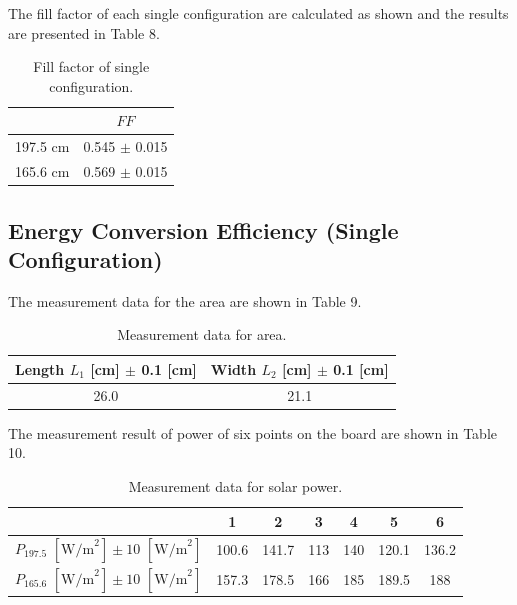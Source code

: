 \documentclass{article}
\begin{document}
{The fill factor of each single configuration are calculated as shown and the results are presented in Table 8.

\begin{table}[H]\centering
    \begin{tabular}{cc}
        \toprule
                 & $FF$               \\
        \midrule
        197.5 cm & 0.545  $\pm$ 0.015 \\
        165.6 cm & 0.569  $\pm$ 0.015 \\
        \bottomrule
    \end{tabular}
    \caption{Fill factor of single configuration.}\label{Tablefill}
\end{table}

\subsection{Energy Conversion Efficiency (Single Configuration)}

The measurement data for the area are shown in Table 9.
\begin{table}[H]\centering
    \begin{tabular}{cc}
        \toprule
        Length $L_1$ [cm] $\pm$ 0.1 [cm] & Width $L_2$ [cm] $\pm$ 0.1 [cm] \\
        \midrule
        26.0                             & 21.1                            \\
        \bottomrule
    \end{tabular}
    \caption{Measurement data for area.}\label{TableArea}
\end{table}

The measurement result of power of six points on the board are shown in Table 10.
\begin{table}[H]\centering
    \begin{tabular}{ccccccc}
        \toprule
                                                               & 1     & 2     & 3   & 4   & 5     & 6     \\
        \midrule
        $P_{197.5}\,\,[\text{W/m}^2] \pm 10\,\,[\text{W/m}^2]$ & 100.6 & 141.7 & 113 & 140 & 120.1 & 136.2 \\
        $P_{165.6}\,\,[\text{W/m}^2] \pm 10\,\,[\text{W/m}^2]$ & 157.3 & 178.5 & 166 & 185 & 189.5 & 188   \\
        \bottomrule
    \end{tabular}
    \caption{Measurement data for solar power.}\label{tab:Pin}
\end{table}

}
\end{document}
